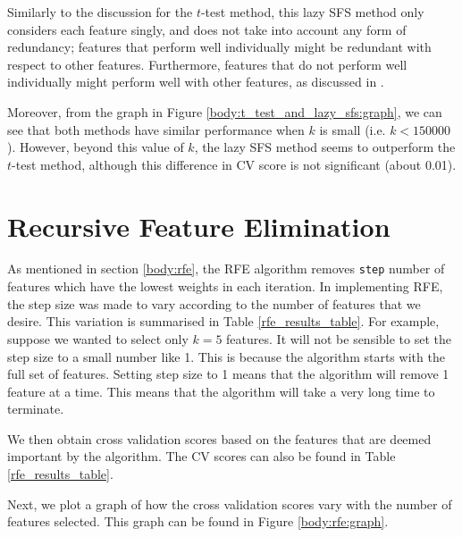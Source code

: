 \documentclass[12pt, twoside, a4paper]{report}
\begin{document}
Similarly to the discussion for the $t$-test method, this lazy SFS method only considers each feature singly, and does not take into account any form of redundancy; features that perform well individually might be redundant with respect to other features. Furthermore, features that do not perform well individually might perform well with other features, as discussed in \cite{RefWorks:140}.

Moreover, from the graph in Figure \ref{body:t_test_and_lazy_sfs:graph}, we can see that both methods have similar performance when $k$ is small (i.e. $k<150000$). However, beyond this value of $k$, the lazy SFS method seems to outperform the $t$-test method, although this difference in CV score is not significant (about 0.01).



\section{Recursive Feature Elimination}

As mentioned in section \ref{body:rfe}, the RFE algorithm removes \texttt{step} number of features which have the lowest weights in each iteration. In implementing RFE, the step size was made to vary according to the number of features that we desire. This variation is summarised in Table \ref{rfe_results_table}. For example, suppose we wanted to select only $k=5$ features. It will not be sensible to set the step size to a small number like 1. This is because the algorithm starts with the full set of features. Setting step size to 1 means that the algorithm will remove 1 feature at a time. This means that the algorithm will take a very long time to terminate.


We then obtain cross validation scores based on the features that are deemed important by the algorithm. The CV scores can also be found in Table \ref{rfe_results_table}.

Next, we plot a graph of how the cross validation scores vary with the number of features selected. This graph can be found in Figure \ref{body:rfe:graph}.
\end{document}
